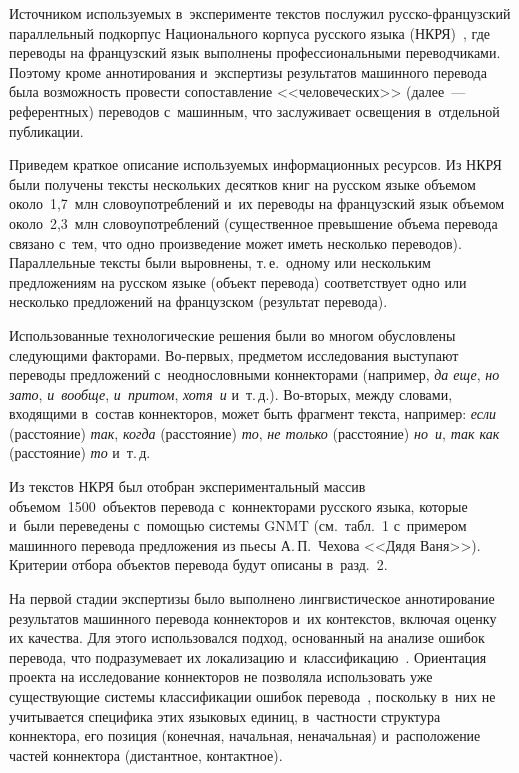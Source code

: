 \begin{multicols}{2}
  Источником используемых в~эксперименте текстов послужил 
  рус\-ско-фран\-цуз\-ский параллельный подкорпус Национального корпуса русского языка 
(НКРЯ)~\cite{12-gz}, где переводы на французский язык выполнены 
профессиональными переводчиками. Поэтому кроме аннотирования 
и~экспертизы результатов машинного перевода была возможность провести 
сопоставление <<человеческих>> (далее~--- референтных) переводов 
с~машинным, что заслуживает освещения в~отдельной пуб\-ли\-кации.
{

}
  
  Приведем краткое описание используемых информационных ресурсов. Из 
НКРЯ были получены тексты нескольких десятков книг на русском языке 
объемом около~1,7~млн словоупотреблений и~их переводы на французский 
язык объемом около~2,3~млн словоупотреблений (существенное превышение 
объема перевода связано с~тем, что одно произведение может иметь несколько 
переводов). Параллельные тексты были выровнены, т.\,е.\ одному или 
нескольким предложениям на русском языке (объект перевода) соответствует 
одно или несколько предложений на французском (результат перевода).
  
  Использованные технологические решения были во многом обусловлены 
следующими фак\-то\-рами. Во-пер\-вых, предметом исследования вы\-сту\-пают 
переводы предложений с~неоднословными коннекторами (например, \textit{да 
еще}, \textit{но зато}, \textit{и~вообще}, \textit{и~притом}, \textit{хотя~и} 
и~т.\,д.). Во-вто\-рых, между словами, входящими в~состав коннекторов, может 
быть фрагмент текста, например: \textit{если} (расстояние) \textit{так}, 
\textit{когда} (расстояние) \textit{то}, \textit{не только} (расстояние) 
\textit{но~и}, \textit{так как} (расстояние) \textit{то} и~т.\,д.
  
  Из текстов НКРЯ был отобран экспериментальный массив 
объемом~1500~объектов перевода с~коннекторами русского языка, которые 
и~были переведены с~помощью системы GNMT (см.\ табл.~1 с~примером 
машинного перевода предложения из пьесы А.\,П.~Чехова <<Дядя Ваня>>). 
Критерии отбора объектов перевода будут описаны в~разд.~2.



   

  На первой стадии экспертизы было выполнено лингвистическое 
аннотирование результатов машинного перевода коннекторов и~их контекстов,\linebreak 
включая оценку их качества. Для этого использовался подход, основанный на 
анализе ошибок перевода, что подразумевает их локализацию 
и~классифи\-кацию~\cite{13-gz}. Ориентация проекта на исследование 
коннекторов не позволяла использовать уже существующие системы 
классификации ошибок перевода~\cite{3-gz, 14-gz}, поскольку в~них не 
учитывается специфика этих языковых единиц, в~част\-ности структура 
коннектора, его позиция (конечная, начальная, неначальная) и~расположение\linebreak 
частей коннектора (дистантное, контактное).


\end{multicols}

